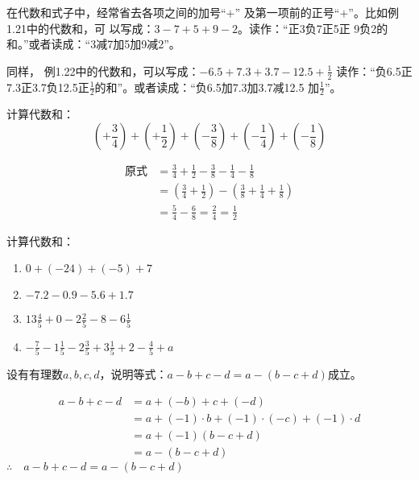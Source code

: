 在代数和式子中，经常省去各项之间的加号“$+$”
及第一项前的正号“$+$”。比如例1.21中的代数和，可
以写成：$3-7+5+9-2$。读作：“正3负7正5正
9负2的和。”或者读成：“3减7加5加9减2”。

同样，
例1.22中的代数和，可以写成：$-6.5+7.3+3.7-12.5+\frac{1}{2}$
读作：“负6.5正7.3正3.7负12.5正$\frac{1}{2}$的和”。或者读成：“负6.5加7.3加3.7减12.5
加$\frac{1}{2}$”。




\begin{example}
 计算代数和：
 \[\left(+\frac{3}{4}\right)+\left(+\frac{1}{2}\right)+\left(-\frac{3}{8}\right)+\left(-\frac{1}{4}\right)+\left(-\frac{1}{8}\right)  \]   
\end{example}


\begin{solution}
      \begin{align*}
    \text{原式}&=\frac{3}{4}+\frac{1}{2}-\frac{3}{8}-\frac{1}{4}-\frac{1}{8}  \tag{简化代数和}\\
    &=\left(\frac{3}{4}+\frac{1}{2}\right)-\left(\frac{3}{8}+\frac{1}{4}+\frac{1}{8}\right)\\
    &=\frac{5}{4}-\frac{6}{8}=\frac{2}{4}=\frac{1}{2}
\end{align*}  
\end{solution}

\begin{ex}
计算代数和：
\begin{enumerate}
    \item $0+(-24)+(-5)+7$
    \item $-7.2-0.9-5.6+1.7$
    \item $13\frac{4}{5}+0-2\frac{2}{5}-8-6\frac{1}{5}$
    \item $-\frac{7}{5}-1\frac{1}{5}-2\frac{3}{5}+3\frac{1}{5}+2-\frac{4}{5}+a$
\end{enumerate} 
\end{ex}

\begin{example}
    设有有理数$a,b,c,d$，说明等式：$a-b+c-d=a-(b-c+d)$成立。
\end{example}

\begin{solution}
\begin{align*}
    a-b+c-d&= a+(-b)+c+(-d) \tag{代数和原意}\\
    &=a+ (-1)\cdot b+(-1)\cdot (-c)+(-1)\cdot d  \tag{相反数意义}\\
&=a+(-1)(b-c+d) \tag{分配律}\\
&=a-(b-c+d)  \tag{相反数意义}    
\end{align*}    
$\therefore\quad a-b+c-d=a-(b-c+d)$
\end{solution}

